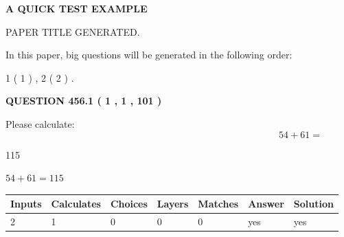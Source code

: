\documentclass[12pt]{article}
\begin{document}
   
 \vspace{0.2in}
{\LARGE {\textbf{ A QUICK TEST EXAMPLE}}}
   
   
 PAPER TITLE GENERATED.
   
   
   
\vspace{0.2in}
   
In this paper, big questions will be generated in the following order: 
   
   
   1 ( 1 )
 ,
   2 ( 2 )
 .
  
\vspace{0.2in}
  
{\textbf{\Large{QUESTION
456.1 
 ( 1 , 1 , 101 )
}}}
  
  
 
Please calculate:
\begin{equation}
54 +  %
61 = \nonumber
\end{equation}
 
 
 
\noindent{}
 
 

115
 
 
\noindent{}
 
 

 
 
 
\noindent{}
 
 

$ %
54 +  %
61=   %
115$
 
 
\noindent{}
 
 

 
   
   
   
   
\noindent\begin{tabular}{|l|l|l|l|l|l|l|}
 \hline
Inputs & Calculates & Choices & Layers & Matches & Answer & Solution \\ \hline
 2  & 
 1  & 
 0
  & 
 0  & 
 0  & 
  yes & 
  yes 
  \\ \hline
 \end{tabular}
   
   
   
   
\noindent{}
   
\end{document}
